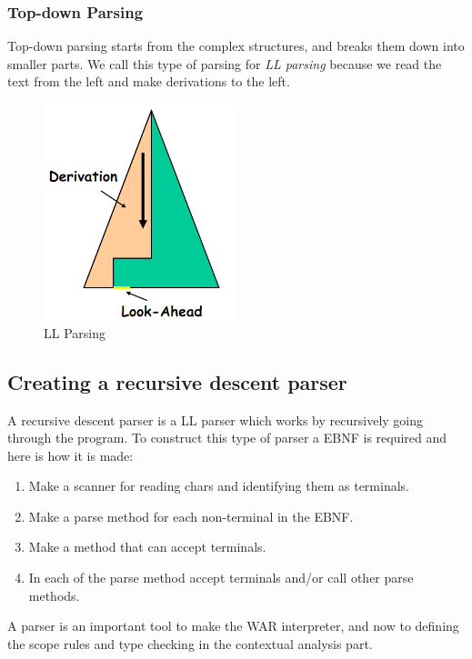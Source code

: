 		\subsubsection*{Top-down Parsing}
			Top-down parsing starts from the complex structures, and breaks them down into smaller parts.
			We call this type of parsing for {\it LL parsing} because we read the text from the left and make derivations to the left.
			\begin{figure}[H]
				\centering
				\includegraphics[width=0.5\textwidth]{rapport/2/figures/topdown.png}
				\caption{LL Parsing}\label{fig:llparsing}
			\end{figure}
	
	\subsection{Creating a recursive descent parser}
		A recursive descent parser is a LL parser which works by recursively going through the program.
		To construct this type of parser a EBNF is required and here is how it is made:
		\begin{enumerate}
			\item Make a scanner for reading chars and identifying them as terminals.
			\item Make a parse method for each non-terminal in the EBNF.
			\item Make a method that can accept terminals.
			\item In each of the parse method accept terminals and/or call other parse methods.
		\end{enumerate}		
		
		
	A parser is an important tool to make the WAR interpreter, and now to defining the scope rules and type checking in the contextual analysis part.		
		
		
		